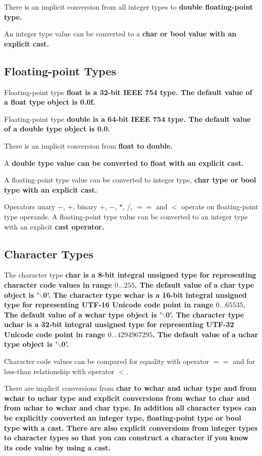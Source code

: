 \documentclass[a4paper,oneside,11pt]{article}
\begin{document}
There is an implicit conversion from all integer types to \bf{double} floating-point type.

An integer type value can be converted to a \bf{char} or \bf{bool} value with an explicit \bf{cast}.

\subsection{Floating-point Types}

Floating-point type \bf{float} is a 32-bit IEEE 754 type.
The default value of a \bf{float} type object is 0.0f.

Floating-point type \bf{double} is a 64-bit IEEE 754 type.
The default value of a \bf{double} type object is 0.0.

There is an implicit conversion from \bf{float} to \bf{double}.

A \bf{double} type value can be converted to \bf{float} with an explicit \bf{cast}.

A floating-point type value can be converted to integer type, \bf{char} type or \bf{bool} type with an explicit \bf{cast}.

Operators unary $-$, $+$, binary $+$, $-$, $*$, $/$, $==$ and $<$ operate on floating-point type operands.
A floating-point type value can be converted to an integer type with an explicit \bf{cast} operator.

\subsection{Character Types}

The character type \bf{char} is a 8-bit integral unsigned type for representing character code values in range $0 \ldots 255$.
The default value of a \bf{char} type object is '$\backslash$0'.
The character type \bf{wchar} is a 16-bit integral unsigned type for representing UTF-16 Unicode code point in range $0 \ldots 65535$.
The default value of a \bf{wchar} type object is '$\backslash$0'.
The character type \bf{uchar} is a 32-bit integral unsigned type for representing UTF-32 Unicode code point in range $0 \ldots 4294967295$.
The default value of a \bf{uchar} type object is '$\backslash$0'.

Character code values can be compared for equality with operator $==$ and for less-than relationship with operator $<$.

There are implicit conversions from \bf{char} to \bf{wchar} and \bf{uchar} type and from \bf{wchar} to \bf{uchar} type and
explicit conversions from \bf{wchar} to \bf{char} and from \bf{uchar} to \bf{wchar} and \bf{char} type.
In addition all character types can be explicitly converted an integer type, floating-point type or \bf{bool} type with a \bf{cast}.
There are also explicit conversions from integer types to character types so that you can construct a character if you know
its code value by using a cast.
\end{document}
